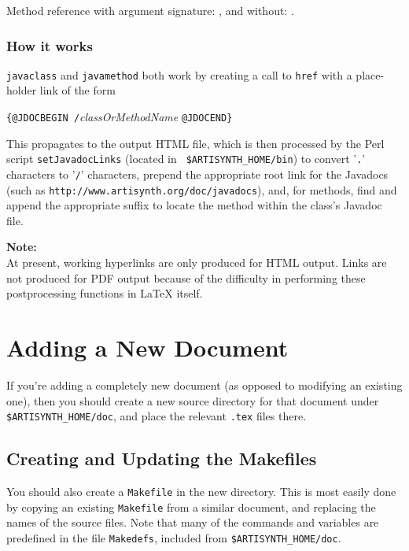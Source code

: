 \documentclass{article}
\begin{document}
Method reference with argument signature:
, and without:
.

\subsubsection{How it works}

{\tt \BKS javaclass} and {\tt \BKS javamethod} both work by creating a call
to {\tt \BKS href} with a place-holder link of the form

 {\tt \{@JDOCBEGIN /}{\it classOrMethodName} {\tt @JDOCEND\}}

This propagates to the output HTML file, which is then processed by
the Perl script {\tt setJavadocLinks} (located in {\tt
\$ARTISYNTH\_HOME/bin}) to convert '{\tt .}' characters to '{\tt /}'
characters, prepend the appropriate root link for the Javadocs (such
as {\tt http://www.\-artisynth.org/doc/javadocs}), and, for methods,
find and append the appropriate suffix to locate the method within the
class's Javadoc file.

\begin{sideblock}
{\bf Note:}\\
At present, working hyperlinks are only produced for HTML output.
Links are not produced for PDF output because of the difficulty
in performing these postprocessing functions in LaTeX itself.
\end{sideblock}

\section{Adding a New Document}

If you're adding a completely new document (as opposed
to modifying an existing one), then you should create a
new source directory for that document under {\tt \$ARTISYNTH\_HOME/doc},
and place the relevant {\tt .tex} files there.

\subsection{Creating and Updating the Makefiles}

You should also create a {\tt Makefile} in the new directory. This is most
easily done by copying an existing {\tt Makefile} from a similar document,
and replacing the names of the source files. 
Note that many of the commands
and variables are predefined in the file {\tt Makedefs}, included from
{\tt \$ARTISYNTH\_HOME/doc}.
\end{document}
